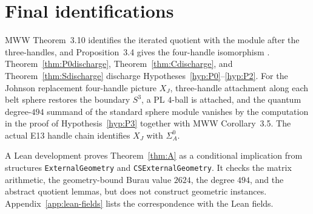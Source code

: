 \section{Final identifications}\label{sec:final-identifications}

MWW Theorem~3.10 identifies the iterated quotient with the module after the
three-handles, and Proposition~3.4 gives the four-handle isomorphism
\cite{ManolescuWalkerWedrich2023}.  Theorem~\ref{thm:P0discharge},
Theorem~\ref{thm:Cdischarge}, and Theorem~\ref{thm:Sdischarge} discharge
Hypotheses~\ref{hyp:P0}--\ref{hyp:P2}.  For the Johnson
replacement four-handle picture $X_J$, three-handle attachment along each
belt sphere restores the boundary $S^3$, a PL $4$-ball is attached, and the
quantum degree-$494$ summand of the standard sphere module vanishes by the
computation in the proof of Hypothesis~\ref{hyp:P3} together with MWW
Corollary~3.5.  The actual E13 handle chain identifies $X_J$ with $\Sigma_A^0$.

\begin{remark}\label{rem:lean-boundary}
A Lean development \cite{Lean4} proves Theorem~\ref{thm:A} as a conditional
implication from structures \texttt{ExternalGeometry} and
\texttt{CSExternalGeometry}.  It checks the matrix arithmetic, the geometry-bound Burau value
$2624$, the degree $494$, and the abstract quotient lemmas, but does not
construct geometric instances.  Appendix~\ref{app:lean-fields}
lists the correspondence with the Lean fields.
\end{remark}
